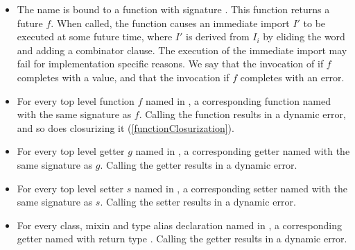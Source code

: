 \documentclass[makeidx]{article}
\begin{document}
{\begin{itemize}
\item The name  is bound to
  a function with signature .
  This function returns a future $f$.
  When called, the function causes
  an immediate import $I'$ to be executed at some future time,
  where $I'$ is derived from $I_i$ by eliding the word \DEFERRED{}
  and adding a \HIDE{}  combinator clause.
  The execution of the immediate import may fail
  for implementation specific reasons.
  We say that the invocation of 
   if $f$ completes with a value,
  and that the invocation
   if $f$ completes with an error.
\item
  For every top level function $f$ named \id{} in
  ,
  a corresponding function named \id{} with the same signature as $f$.
  Calling the function results in a dynamic error,
  and so does closurizing it
  (\ref{functionClosurization}).
\item
  For every top level getter $g$ named \id{} in
  ,
  a corresponding getter named \id{} with the same signature as $g$.
  Calling the getter results in a dynamic error.
\item
  For every top level setter $s$ named \code{\id=} in
  ,
  a corresponding setter named \code{\id=} with the same signature as $s$.
  Calling the setter results in a dynamic error.
\item
  For every class, mixin and type alias declaration named \id{} in
  ,
  a corresponding getter named \id{} with return type .
  Calling the getter results in a dynamic error.
\end{itemize}


}
\end{document}
